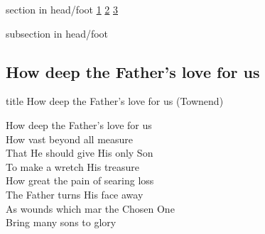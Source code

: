 \documentclass{beamer}
\begin{document}
{
{ 
 {
 \begin{beamercolorbox}[ht=4.5ex,dp=1.5ex,%
      leftskip=.3cm,rightskip=.3cm plus1fil]{section in head/foot}
 \fontsize{12}{25}\selectfont 
\hyperlink{How deep the Father's love for us[](Townend)1}{1}
\hyperlink{How deep the Father's love for us[](Townend)2}{2}
\hyperlink{How deep the Father's love for us[](Townend)3}{3}
 
 \end{beamercolorbox}%
  \begin{beamercolorbox}[ht=2.5ex,dp=1.125ex,%
   leftskip=.3cm,rightskip=.3cm plus1fil]{subsection in head/foot}
   \insertauthor
 \end{beamercolorbox}%
 }
}
\subsection{ How deep the Father's love for us }

\hypertarget{How deep the Father's love for us[](Townend)}{}
\begin{frame}{}
 \vfill
  \centering
  \begin{beamercolorbox}[sep=8pt,center,shadow=true,rounded=true]{title}
    How deep the Father's love for us (Townend)    
  \end{beamercolorbox}
  \vfill
\end{frame}

\hypertarget{How deep the Father's love for us[](Townend)1}{}
\begin{frame}{}
\fontsize{ 18 }{ 23 }\selectfont

How deep the Father's love for us\\ 
How vast beyond all measure\\ 
That He should give His only Son\\ 
To make a wretch His treasure\\ 
How great the pain of searing loss\\ 
The Father turns His face away\\ 
As wounds which mar the Chosen One\\ 
Bring many sons to glory 

\end{frame}

\hypertarget{How deep the Father's love for us[](Townend)2}{}
\begin{frame}{}
\fontsize{ 18 }{ 23 }\selectfont


\end{frame}}
\end{document}
